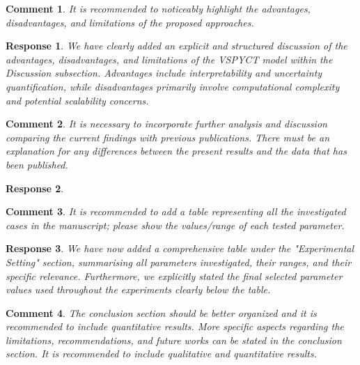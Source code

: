 \documentclass [a4paper,11pt]{article}
\theoremstyle{blue}
\newtheorem{question}{Comment}[section]
\theoremstyle{blue}
\theoremstyle{note}
\newtheorem{answer}{Response}[section]
\theoremstyle{note}
\begin{document}
\begin{question}

It is recommended to noticeably highlight the advantages, disadvantages, and limitations of the proposed approaches.

\end{question}

\begin{answer}

We have clearly added an explicit and structured discussion of the advantages, disadvantages, and limitations of the VSPYCT model within the Discussion subsection. Advantages include interpretability and uncertainty quantification, while disadvantages primarily involve computational complexity and potential scalability concerns.

\end{answer}

\begin{question}

It is necessary to incorporate further analysis and discussion comparing the current findings with previous publications. There must be an explanation for any differences between the present results and the data that has been published.

\end{question}

\begin{answer}



\end{answer}

\begin{question}

It is recommended to add a table representing all the investigated cases in the manuscript; please show the values/range of each tested parameter.

\end{question}

\begin{answer}

We have now added a comprehensive table under the "Experimental Setting" section, summarising all parameters investigated, their ranges, and their specific relevance. Furthermore, we explicitly stated the final selected parameter values used throughout the experiments clearly below the table.

\end{answer}

\begin{question}

The conclusion section should be better organized and it is recommended to include quantitative results. More specific aspects regarding the limitations, recommendations, and future works can be stated in the conclusion section. It is recommended to include qualitative and quantitative results.

\end{question}
\end{document}
